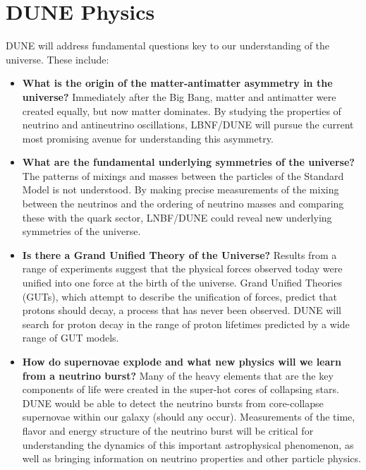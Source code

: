 \chapter{DUNE Physics}
\label{ch:exec-summ-physics}

DUNE will address fundamental questions key to our understanding of the universe. These include:
\begin{itemize}
   \item {\bf What is the origin of the matter-antimatter asymmetry in the universe?}
      Immediately after the Big Bang, matter and antimatter were created equally, but 
      now matter dominates.  By studying the properties of neutrino and antineutrino oscillations, 
      LBNF/DUNE will pursue the current most promising avenue for understanding this asymmetry.
   \item {\bf What are the fundamental underlying symmetries of the universe?} 
      The patterns of mixings and masses between the particles of the Standard Model 
      is not understood. By making precise measurements of the mixing between the neutrinos 
      and the ordering of neutrino masses and comparing these with the quark sector, 
      LNBF/DUNE could reveal new underlying symmetries of the universe.
  \item{\bf  Is there a Grand Unified Theory of the Universe?} 
      Results from a range of experiments suggest that the physical forces observed today 
      were unified into one force at the birth of the universe.  Grand Unified Theories (GUTs), 
      which attempt to describe the unification of forces, predict that protons should decay, 
      a process that has never been observed. DUNE will search for proton decay in the range of 
      proton lifetimes predicted by a wide range of GUT models.
   \item{\bf How do supernovae explode and what new physics will we learn from a neutrino burst?}
      Many of the heavy elements that are the key components of life were created in the 
      super-hot cores of collapsing stars.  DUNE would be able to detect the neutrino bursts 
      from core-collapse supernovae within our galaxy (should any occur).  Measurements of the 
      time, flavor and energy structure of the neutrino burst will be critical for understanding 
      the dynamics of this important astrophysical phenomenon, as well as bringing information 
      on neutrino properties and other particle physics.
\end{itemize}

